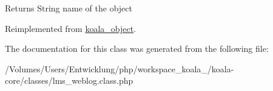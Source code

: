 \begin{DoxyReturn}{Returns}
String name of the object 
\end{DoxyReturn}


Reimplemented from \hyperlink{classkoala__object_aa2a31792717f7865ab1326a332cad10e}{koala\_\-object}.



The documentation for this class was generated from the following file:\begin{DoxyCompactItemize}
\item 
/Volumes/Users/Entwicklung/php/workspace\_\-koala\_/koala-\/core/classes/lms\_\-weblog.class.php\end{DoxyCompactItemize}
